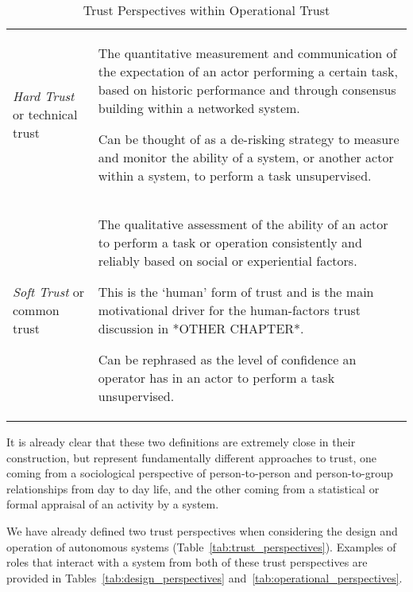 \begin{table}
  \caption{Trust Perspectives within Operational Trust}
  \label{tab:operational_trust_perspectives}
  \begin{tabularx}{\textwidth}{p{3cm}X}\toprule
    \emph{Hard Trust} or technical trust & The quantitative measurement and communication of the expectation of an actor performing a certain task, based on historic performance and through consensus building within a networked system.\par
    Can be thought of as a de-risking strategy to measure and monitor the ability of a system, or another actor within a system, to perform a task unsupervised.\\
    \emph{Soft Trust} or common trust & The qualitative assessment of the ability of an actor to perform a task or operation consistently and reliably based on social or experiential factors.\par
    This is the ‘human’ form of trust and is the main motivational driver for the human-factors trust discussion in *OTHER CHAPTER*.\par
    Can be rephrased as the level of confidence an operator has in an actor to perform a task unsupervised.\\
    \bottomrule
  \end{tabularx}
\end{table}

It is already clear that these two definitions are extremely close in their construction, but represent fundamentally different approaches to trust, one coming from a sociological perspective of person-to-person and person-to-group relationships from day to day life, and the other coming from a statistical or formal appraisal of an activity by a system.

We have already defined two trust perspectives when considering the design and operation of autonomous systems (Table~\ref{tab:trust_perspectives}).
Examples of roles that interact with a system from both of these trust perspectives are provided in Tables~\ref{tab:design_perspectives} and~\ref{tab:operational_perspectives}.


